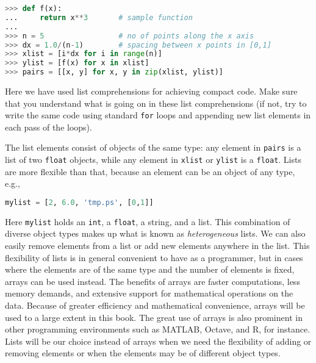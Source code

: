 \documentclass[graybox,sectrefs,envcountresetchap,open=right,final]{svmonodo}
\begin{document}
\begin{lstlisting}[language=Python,style=simple,xleftmargin=2mm]
>>> def f(x):
...     return x**3       # sample function
...
>>> n = 5                 # no of points along the x axis
>>> dx = 1.0/(n-1)        # spacing between x points in [0,1]
>>> xlist = [i*dx for i in range(n)]
>>> ylist = [f(x) for x in xlist]
>>> pairs = [[x, y] for x, y in zip(xlist, ylist)]

\end{lstlisting}

Here we have used list comprehensions for achieving compact code. Make
sure that you understand what is going on in these list comprehensions
(if not, try to write the same code using standard \texttt{for} loops and
appending new list elements in each pass of the loops).


The list elements consist of objects of the same type: any element in
\texttt{pairs} is a list of two \texttt{float} objects, while any element in \texttt{xlist}
or \texttt{ylist} is a \texttt{float}. Lists are more flexible than that, because an
element can be an object of any type, e.g.,



\begin{lstlisting}[language=Python,style=simple,xleftmargin=2mm]
mylist = [2, 6.0, 'tmp.ps', [0,1]]

\end{lstlisting}

Here \texttt{mylist} holds an \texttt{int}, a \texttt{float}, a string, and a list. This
combination of diverse object types makes up what is known as
\emph{heterogeneous} lists.  We can also easily remove elements from a list
or add new elements anywhere in the list.  This flexibility of lists
is in general convenient to have as a programmer, but in cases where
the elements are of the same type and the number of elements is fixed,
arrays can be used instead. The benefits of arrays are faster
computations, less memory demands, and extensive support for
mathematical operations on the data.  Because of greater efficiency
and mathematical convenience, arrays will be used to a large extent in
this book.  The great use of arrays is also prominent in other
programming environments such as MATLAB, Octave, and R, for instance.
Lists will be our choice instead of arrays when we need the
flexibility of adding or removing elements or when the elements may be
of different object types.
\end{document}
